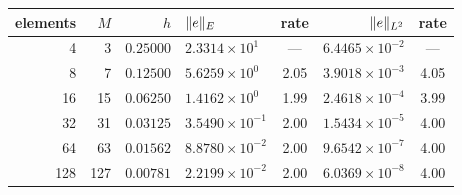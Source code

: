 \begin{tabular}{@{}rrrlcrc@{}}
\toprule
elements & $M$ & $h$ & $\lVert e\rVert_{E}$ & rate & $\lVert e\rVert_{L^{2}}$ & rate\\
\midrule
4 & 3 & $0.25000$ & $2.3314\!\times\!10^{1}$ & --- & $6.4465\!\times\!10^{-2}$ & ---\\
8 & 7 & $0.12500$ & $5.6259\!\times\!10^{0}$ & 2.05 & $3.9018\!\times\!10^{-3}$ & 4.05\\
16 & 15 & $0.06250$ & $1.4162\!\times\!10^{0}$ & 1.99 & $2.4618\!\times\!10^{-4}$ & 3.99\\
32 & 31 & $0.03125$ & $3.5490\!\times\!10^{-1}$ & 2.00 & $1.5434\!\times\!10^{-5}$ & 4.00\\
64 & 63 & $0.01562$ & $8.8780\!\times\!10^{-2}$ & 2.00 & $9.6542\!\times\!10^{-7}$ & 4.00\\
128 & 127 & $0.00781$ & $2.2199\!\times\!10^{-2}$ & 2.00 & $6.0369\!\times\!10^{-8}$ & 4.00\\
\bottomrule
\end{tabular}
